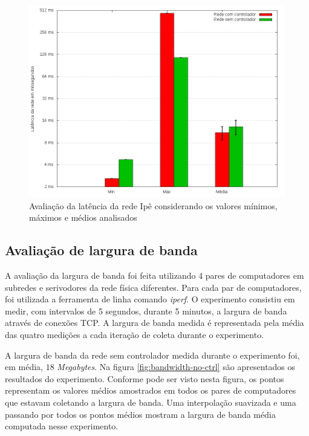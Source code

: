 \begin{figure}[!htb]
    \centering
    \label{fig:ipe-latency-stats}
    \includegraphics[width=\linewidth]{img/ipe-latency-stats}
    \caption{Avaliação da latência da rede Ipê considerando os valores mínimos,
    máximos e médios analisados}
\end{figure}

\subsection{Avaliação de largura de banda}

A avaliação da largura de banda foi feita utilizando 4 pares de computadores
em subredes e serivodores da rede física diferentes.
Para cada par de computadores, foi utilizada a ferramenta de linha comando
\emph{iperf}.
O experimento consistiu em medir, com intervalos de 5 segundos, durante 
5 minutos, a largura de banda através de conexões TCP.
A largura de banda medida é representada pela média das quatro medições a
cada iteração de coleta durante o experimento.

A largura de banda da rede sem controlador medida durante o experimento foi, 
em média, $18$ \emph{Megabytes}.
Na figura \ref{fig:bandwidth-no-ctrl} são apresentados os resultados do 
experimento. 
Conforme pode ser visto nesta figura, os pontos representam os valores 
médios amostrados em todos os pares de computadores que estavam coletando 
a largura de banda.
Uma interpolação suavizada e uma passando por todos os pontos médios mostram
a largura de banda média computada nesse experimento.


